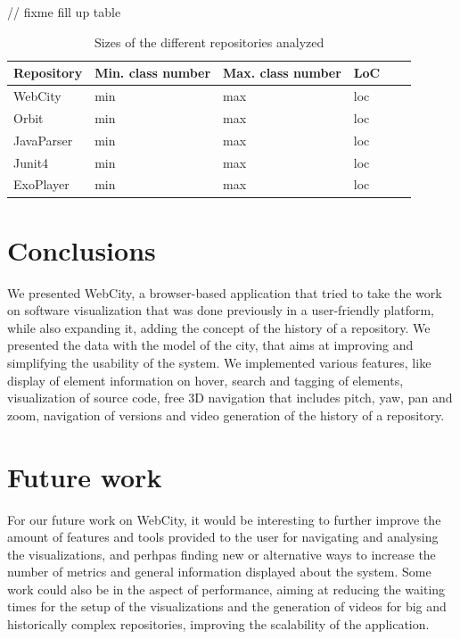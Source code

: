 \documentclass[]{usiinfbachelorproject}
\begin{document}
// fixme fill up table
\begin{table}[H]
    \begin{center}
        \begin{tabular}{ | l | l | l | l | l | l |}
        \hline
        Repository & Min. class number & Max. class number & LoC \\ \hline
        WebCity & min & max & loc \\ \hline
        Orbit & min & max & loc \\ \hline
        JavaParser & min & max & loc \\ \hline
        Junit4 & min & max & loc \\ \hline
        ExoPlayer & min & max & loc \\ \hline
        \end{tabular}
    \end{center}
    \caption{Sizes of the different repositories analyzed}
    \label{tab:performance}
\end{table}



\section{Conclusions} \label{Conclusions}
We presented WebCity, a browser-based application that tried to take the work on software visualization that was done previously in a user-friendly platform, while also expanding it, adding the concept of the history of a repository.
We presented the data with the model of the city, that aims at improving and simplifying the usability of the system.
We implemented various features, like display of element information on hover, search and tagging of elements, visualization of source code, free 3D navigation that includes pitch, yaw, pan and zoom, navigation of versions and video generation of the history of a repository.

\section{Future work} \label{Future work}

For our future work on WebCity, it would be interesting to further improve the amount of features and tools provided to the user for navigating and analysing the visualizations, and perhpas finding new or alternative ways to increase the number of metrics and general information displayed about the system.
Some work could also be in the aspect of performance, aiming at reducing the waiting times for the setup of the visualizations and the generation of videos for big and historically complex repositories, improving the scalability of the application.
\end{document}
